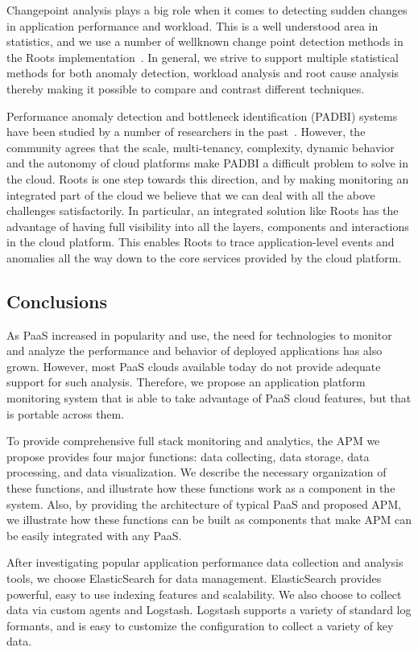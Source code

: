 Changepoint analysis plays a big role when it comes to detecting
sudden changes in application performance and workload. This is a well
understood area in statistics, and we use a number of wellknown 
change point detection methods in the Roots implementation~\cite{killick2012optimal,cl93,bereznay2006did}. 
In general, we strive to support multiple statistical methods for
both anomaly detection, workload analysis and root cause analysis
thereby making it possible to compare and contrast different techniques.

Performance anomaly detection and bottleneck identification (PADBI) systems
have been studied by a number of researchers in the past~\cite{Ibidunmoye:2015:PAD:2808687.2791120}. 
However,
the community agrees that the scale, multi-tenancy, complexity,
dynamic behavior and the autonomy of cloud platforms make PADBI a
difficult problem to solve in the cloud. Roots is one step towards this direction,
and by making monitoring an integrated part of the cloud we believe
that we can deal with all the above challenges satisfactorily. In 
particular, an integrated solution like Roots has the advantage of
having full visibility into all the layers, components and interactions
in the cloud platform. This enables Roots to trace application-level
events and anomalies all the way down to the core services provided
by the cloud platform.

\subsection{Conclusions}
As PaaS increased in popularity and use, the need 
for technologies to monitor and analyze the performance and behavior of
deployed applications has also grown. 
However, most PaaS clouds available today do not provide adequate support
for such analysis.
Therefore, we propose an application platform monitoring system that 
is able to take advantage of PaaS cloud features, but that is portable
across them.

To provide comprehensive full stack monitoring and analytics, 
the APM we propose provides four major functions:
data collecting, data storage, data processing, and data visualization. 
We describe the necessary organization of
these functions, and illustrate how these functions work as 
a component in the system. Also, by providing the
architecture of typical PaaS and proposed APM, we illustrate how these functions can be built as components that
make APM can be easily integrated with any PaaS.

After investigating popular application performance data collection and analysis tools, we choose ElasticSearch for data management.
ElasticSearch provides powerful, easy to use indexing features and scalability. We also choose to collect data via custom agents and Logstash.
Logstash supports a variety of standard log formants,
and is easy to customize the configuration to collect a variety of key data.
